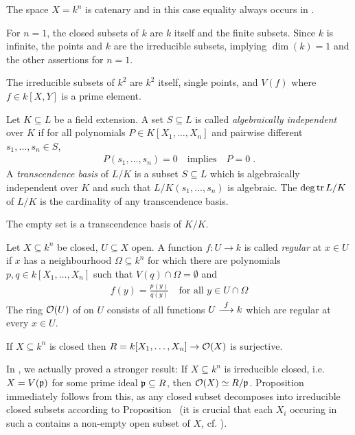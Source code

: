 \documentclass[a4paper,parskip=half,numbers=enddot, DIV=12]{scrreprt}
\begin{document}
\begin{thm}
	The space $X=k^n$ is catenary and in this case equality always occurs in .
\end{thm}
\begin{example}
	For $n=1$, the closed subsets of $k$ are $k$ itself and the finite subsets. Since $k$ is infinite, the points and $k$ are the irreducible subsets, implying $\dim(k) = 1 $ and the other assertions for $n=1$.
\end{example}
\begin{example}
	The irreducible subsets of $k^2$ are $k^2$ itself, single points, and $V(f)$ where $f\in k[X,Y]$ is a prime element.
\end{example}
\begin{defi}
	Let $K\subseteq L$ be a field extension. A set $S\subseteq L$ is called \emph{algebraically independent} over $K$ if for all polynomials $P\in K[X_1,\ldots,X_n]$ and pairwise different $s_1,\ldots, s_n\in S$, 
	\begin{align*}
	P(s_1,\ldots, s_n) =0\quad\text{implies}\quad P=0\;. 
	\end{align*}
	A \emph{transcendence basis} of $L/K$ is a subset $S\subseteq L$ which is algebraically independent over $K$ and such that $L/K(s_1,\ldots,s_n)$ is algebraic. The  $\deg\operatorname{tr} L/K$ of $L/K$ is the cardinality of any transcendence basis.
\end{defi}
\begin{example*}
	The empty set is a transcendence basis of $K/K$. 
\end{example*}
\begin{defi} 
	Let $X\subseteq k^n$ be closed, $U\subseteq X$ open. A function $f\colon U\to k$ is called \emph{regular} at $x\in U$ if $x$ has a neighbourhood $\Omega\subseteq k^n$ for which there are polynomials $p,q\in k[X_1,\ldots,X_n]$ such that $V(q)\cap \Omega=\emptyset$ and 
	\begin{align*}
	f(y) = \frac{p(y)}{q(y)}\quad\text{for all }y\in U\cap \Omega
	\end{align*}
	The ring $\mathcal{O}(U)$ of  on $U$ consists of all functions $U\morphism[f] k$ which are regular at every $x\in U$.
\end{defi}
\begin{prop}
	If $X\subseteq k^n$ is closed then $R= k[X_1,\ldots, X_n] \to \mathcal{O}(X)$ is surjective.
\end{prop}
In \cite[Proposition~2.2.2]{alg1}, we actually proved a stronger result: If $X\subseteq k^n$ is irreducible closed, i.e. $X=V(\mathfrak{p})$ for some prime ideal $\mathfrak{p}\subseteq R$, then $\mathcal{O}(X)\simeq R/\mathfrak{p}$. Proposition~ immediately follows from this, as any closed subset decomposes into irreducible closed subsets according to Proposition~ (it is crucial that each $X_i$ occuring in such a contains a non-empty open subset of $X$, cf. \cite[Proposition~2.1.1]{alg1}).
\end{document}
